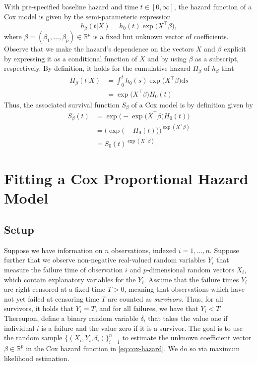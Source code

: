 \documentclass[11pt]{article}
\newcommand{\R}{\mathbb{R}}
\renewcommand{\d}{\text{d}}
\begin{document}
With pre-specified baseline hazard and time $t \in[0,\infty]$, the hazard function of a Cox model is given by the semi-parameteric expression
\begin{equation}\label{eq:cox-hazard}
    h_\beta(t | X) = h_0(t) \exp \big( X^\top \beta \big),
\end{equation}
where $\beta = (\beta_1,\dots,\beta_p)\in\R^p$ is a fixed but unknown vector of coefficients. Observe that we make the hazard's dependence on the vectors $X$ and $\beta$ explicit by expressing it as a conditional function of $X$ and by using $\beta$ as a subscript, respectively. By definition, it holds for the cumulative hazard $H_\beta$ of $h_\beta$ that
\begin{equation*}
\begin{split}
    H_\beta(t|X) &= \int^t_0 h_0(s) \exp \big(X^\top \beta \big) \d s
    \\
    &= \exp \big(X^\top \beta \big) H_0(t)
\end{split}
\end{equation*}
Thus, the associated survival function $S_\beta$ of a Cox model is by definition given by
\begin{equation} \label{eq:cox-survival}
\begin{split}
    S_\beta(t) 
    &=
    \exp\Big( - \exp\big( X^\top \beta \big) H_0(t)  \Big)
    \\&=
    \Big(\exp\big( - H_0(t) \big) \Big)^{\exp(X^\top \beta)}
    \\&=
    S_0(t)^{\exp(X^\top \beta)}.
\end{split}
\end{equation}

\section{Fitting a Cox Proportional Hazard Model}
\subsection{Setup}
Suppose we have information on $n$ observations, indexed $i=1,\dots,n$. Suppose further that we observe non-negative real-valued random variables $Y_i$ that measure the failure time of observation $i$ and $p$-dimensional random vectors $X_i$, which contain explanatory variables for the $Y_i$. Assume that the failure times $Y_i$ are right-censored at a fixed time $T>0$, meaning that observations which have not yet failed at censoring time $T$ are counted as \textit{survivors}. Thus, for all survivors, it holds that $Y_i = T$, and for all failures, we have that $Y_i < T$. Thereupon, define a binary random variable $\delta_i$ that takes the value one if individual $i$ is a failure and the value zero if it is a survivor. The goal is to use the random sample $\big\{ (X_i, Y_i, \delta_i) \big\}_{i=1}^n$ to estimate the unknown coefficient vector $\beta\in\R^p$ in the Cox hazard function in \eqref{eq:cox-hazard}. We do so via maximum likelihood estimation. 
\end{document}

